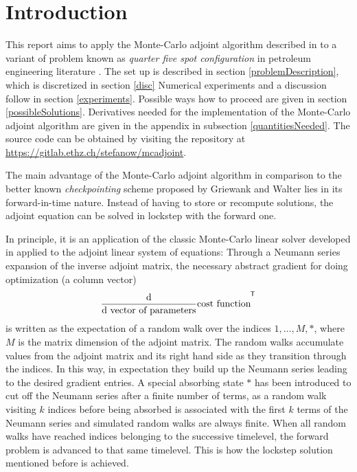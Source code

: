 \documentclass[twoside]{IEEEtran}
\renewcommand*{\d}[1]{\ensuremath{\mathrm{d}#1}}
\newcommand*{\diff}[2]{\ensuremath{\frac{\d}{\d{#2}}{#1}}}
\newcommand*{\transpose}[1]{{#1}^{\mkern-1.5mu\mathsf{T}}}
\begin{document}
\section{Introduction}
This report aims to apply the Monte-Carlo adjoint algorithm described in \cite{unsteady} to a variant of problem known as \emph{quarter five spot configuration} in petroleum engineering literature \cite{quarterFiveSpot}. The set up is described in section \ref{problemDescription}, which is discretized in section \ref{disc}
Numerical experiments and a discussion follow in section \ref{experiments}. Possible ways how to proceed are given in section \ref{possibleSolutions}. Derivatives needed for the implementation of the Monte-Carlo adjoint algorithm are given in the appendix in subsection \ref{quantitiesNeeded}. The source code can be obtained by visiting the repository at
\href{https://gitlab.ethz.ch/stefanow/mcadjoint}{https://gitlab.ethz.ch/stefanow/mcadjoint}.


The main advantage of the Monte-Carlo adjoint algorithm in comparison to the better known \emph{checkpointing} scheme proposed by Griewank and Walter \cite{checkpointing} lies in its forward-in-time nature. Instead of having to store or recompute solutions, the adjoint equation can be solved in lockstep with the forward one.

In principle, it is an application of the classic Monte-Carlo linear solver developed in \cite{forsythe} applied to the adjoint linear system of equations: Through a Neumann series expansion of the inverse adjoint matrix, the necessary abstract gradient for doing optimization (a column vector)
\begin{equation}
\transpose{\diff{\text{cost function}}{\text{ vector of parameters}}}
\end{equation}
is written as the expectation of a random walk over the indices $1, \ldots, M, \ast$, where $M$ is the matrix dimension of the adjoint matrix.
The random walks accumulate values from the adjoint matrix and its right hand side as they transition through the indices.
In this way, in expectation they build up the Neumann series leading to the desired gradient entries.
A special absorbing state $\ast$ has been introduced to cut off the Neumann series after a finite number of terms, as
a random walk visiting $k$ indices before being absorbed is associated with the first $k$ terms of the Neumann series and simulated random walks are always finite.
When all random walks have reached indices belonging to the successive timelevel, the forward problem is advanced to that same timelevel.
This is how the lockstep solution mentioned before is achieved.
\end{document}

